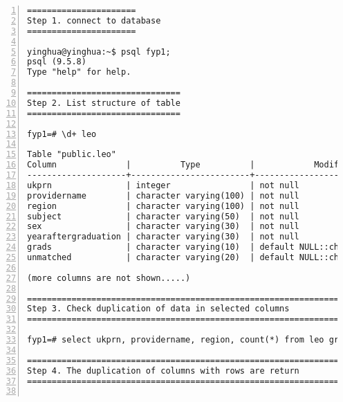 \lstset{basicstyle=\ttfamily\tiny} 
\begin{lstlisting}[breaklines, frame=single, numbers=left, caption={Identify column uniqueness}, label=commandline-02]
======================
Step 1. connect to database
======================

yinghua@yinghua:~$ psql fyp1;
psql (9.5.8)
Type "help" for help.

===============================
Step 2. List structure of table
===============================

fyp1=# \d+ leo

Table "public.leo"
Column              |          Type          |            Modifiers            | Storage  | 
--------------------+------------------------+---------------------------------+----------+
ukprn               | integer                | not null                        | plain    |
providername        | character varying(100) | not null                        | extended |
region              | character varying(100) | not null                        | extended |
subject             | character varying(50)  | not null                        | extended |
sex                 | character varying(30)  | not null                        | extended |
yearaftergraduation | character varying(30)  | not null                        | extended |
grads               | character varying(10)  | default NULL::character varying | extended |
unmatched           | character varying(20)  | default NULL::character varying | extended |

(more columns are not shown.....)

===============================================================
Step 3. Check duplication of data in selected columns
===============================================================

fyp1=# select ukprn, providername, region, count(*) from leo group by ukprn, providername, region having count(*) > 1;

===============================================================
Step 4. The duplication of columns with rows are return
===============================================================


\end{lstlisting}
